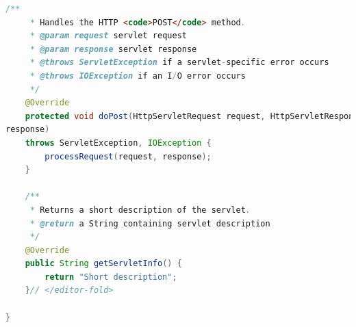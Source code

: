 \documentclass[a4paper,12pt]{article}
\begin{document}
\begin{lstlisting}[language=Java, style=customJava, 
caption={HomeServlet.java}, captionpos=b,basicstyle=\fontfamily{cmss}\small]
    /** 
     * Handles the HTTP <code>POST</code> method.
     * @param request servlet request
     * @param response servlet response
     * @throws ServletException if a servlet-specific error occurs
     * @throws IOException if an I/O error occurs
     */
    @Override
    protected void doPost(HttpServletRequest request, HttpServletResponse 
response)
    throws ServletException, IOException {
        processRequest(request, response);
    }

    /** 
     * Returns a short description of the servlet.
     * @return a String containing servlet description
     */
    @Override
    public String getServletInfo() {
        return "Short description";
    }// </editor-fold>

}
\end{lstlisting}
\end{document}
